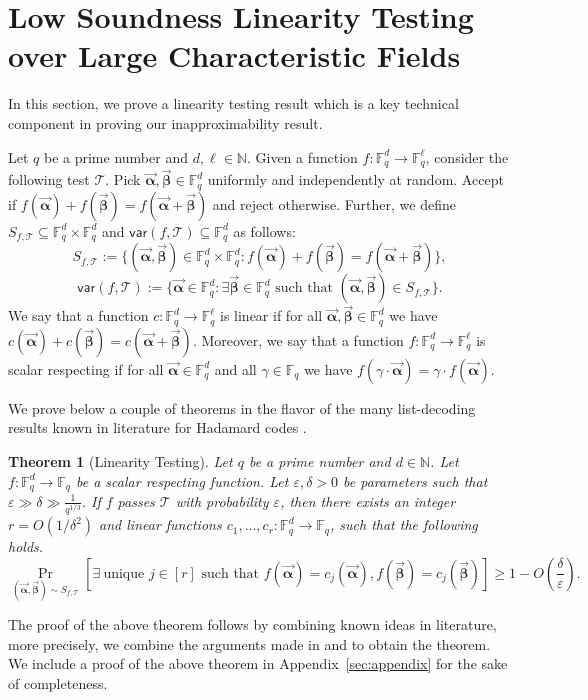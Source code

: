 \documentclass[11pt]{article}
\newcommand{\F}{\mathbb{F}}
\renewcommand{\ge}{ \geqslant}
\newtheorem{theorem}{Theorem}[section]
\renewcommand{\epsilon}{\varepsilon}
\newcommand{\alphab}{\vec{\bm{\alpha}}}
\newcommand{\betab}{\vec{\bm{\beta}}}
\newcommand{\var}{\mathsf{var}}
\begin{document}
\section{Low Soundness Linearity Testing over Large Characteristic Fields}\label{sec:lintest}

In this section, we prove a linearity testing result which is a key  technical component in proving our inapproximability result. 

Let $q$ be a prime number and $d,\ell\in\mathbb{N}$.
Given a function $f:\F_q^d\to\F_q^{\ell}$, consider the following test $\mathcal{T}$. 
Pick $\alphab,\betab\in \F_q^d$ uniformly and independently at random. Accept if $f(\alphab)+f(\betab)=f(\alphab+\betab)$ and reject otherwise. Further, we define $S_{f,\mathcal{T}}\subseteq \F_q^d\times \F_q^d$ and $\var(f,\mathcal{T})\subseteq \F_q^d$ as follows:
$$
S_{f,\mathcal{T}}:=\{(\alphab,\betab)\in\F_q^d\times \F_q^d: f(\alphab)+f(\betab)=f(\alphab+\betab) \},
$$
$$
\var(f,\mathcal{T}):=\{\alphab\in\F_q^d: \exists \betab \in \F_q^d \text{ such that }(\alphab,\betab)\in S_{f,\mathcal{T}} \}.
$$
We say that a function $c:\F_q^d\to\F_q^{\ell}$ is linear if for all $\alphab,\betab\in \F_q^d$ we have $c(\alphab)+c(\betab)=c(\alphab+\betab)$. 
Moreover, we say that a function $f:\F_q^d\to\F_q^{\ell}$ is scalar respecting if for all $\alphab\in \F_q^d$ and all $\gamma\in\F_q$ we have $f(\gamma\cdot \alphab)=\gamma\cdot f(\alphab)$.

We prove below a couple of theorems in the flavor of the many list-decoding  results known in literature for Hadamard codes \cite{GL89,GRS00,G09}. 
 
\begin{theorem}[Linearity Testing]\label{thm:lintest}
Let $q$ be a prime number and $d\in \mathbb{N}$.
Let $f:\F_q^d\to\F_q$ be a scalar respecting function. Let $\epsilon, \delta > 0$ be parameters such that 
$\epsilon \gg \delta \gg \frac{1}{q^{1/3}}$. 
If $f$  passes $\mathcal{T}$ with probability $\varepsilon$, then  there exists an integer $r = O(1/\delta^2)$ and 
\emph{linear} functions $c_1,\ldots ,c_r:\F_q^d\to\F_q$, such that the following holds.
$$
\underset{ (\alphab, \betab) \sim S_{f,\mathcal{T}} }{\Pr}\left[\exists\ \text{unique } j\in[r] \text{ such that }f(\alphab)=c_j(\alphab),
 f(\betab)=c_j(\betab) \right]\ge 1- O\left(\frac{\delta}{\epsilon}\right).
$$
\end{theorem} 


The proof of the above theorem follows by combining known ideas in literature, more precisely, we combine the arguments made in \cite{AS03} and \cite{KS13} to obtain the theorem. We include a proof of the above theorem in Appendix~\ref{sec:appendix} for the sake of completeness. 
\end{document}
